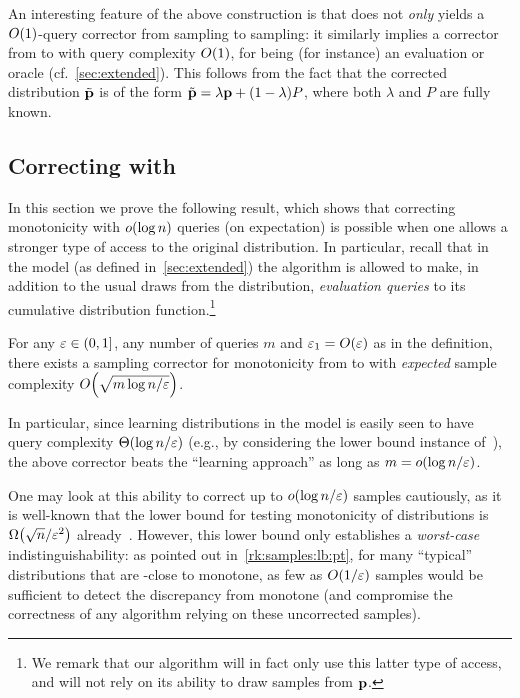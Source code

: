 \begin{remark}\label{rk:oblivious:stronger:queries}
An interesting feature of the above construction is that does not
\emph{only} yields a $\bigO{1}$-query corrector from {sampling to sampling}: it
similarly implies a corrector from \ORACLE to \ORACLE with query complexity
$\bigO{1}$, for \ORACLE being (for instance) an evaluation or \Cdfsamp oracle (cf.~\cref{sec:extended}). 
This follows from the fact that the corrected distribution $\tilde{\mathbf{p}}$ is of the form $\tilde{\mathbf{p}} = \lambda\mathbf{p}+(1-\lambda)P$, where
both $\lambda$ and $P$ are fully known.
\end{remark}

\subsection{Correcting with }\label{sec:monotonicity:cdf}
\newcommand{\supb}{S}

In this section we prove the following result, which shows that correcting monotonicity with $\littleO{\log n}$ queries (on expectation) is possible when one allows a stronger type of access to the original distribution. In particular, recall that in the \Cdfsamp model (as defined in~\cref{sec:extended}) the algorithm is allowed to make, in addition to the usual draws from the distribution, \emph{evaluation queries} to its cumulative distribution function.\footnote{We remark that our algorithm will in fact only use this latter type of access, and will not rely on its ability to draw samples from $\mathbf{p}$.}

\begin{theorem}\label{theo:samp:corrector:monotonicity:cdf}
For any $\varepsilon \in (0,1]$, any number of queries $m$ and $\eps_1 = \bigO{\eps}$ as in the definition, there exists a sampling corrector for monotonicity from \Cdfsamp to \SAMP with \emph{expected} sample complexity $\bigO{\sqrt{m\log n/\eps}}$.
\end{theorem}
\noindent In particular, since learning distributions in the \Cdfsamp model is easily seen to have query complexity $\bigTheta{\log n/\eps}$ (e.g., by considering the lower bound instance of~\cite{Birge:87}), the above corrector beats the ``learning approach'' as long as $m=\littleO{\log n/\eps}$.

{
\begin{remark}
One may look at this ability to correct up to $\littleO{\log n/\eps}$ samples cautiously, as it is well-known that the lower bound for testing monotonicity of distributions is $\bigOmega{\sqrt{n}/\eps^2}$ already~\cite{BKR:04}. However, this lower bound only establishes a \emph{worst-case} indistinguishability: as pointed out in~\cref{rk:samples:lb:pt}, for many ``typical'' distributions that are \eps-close to monotone, as few as $O(1/\varepsilon)$ samples would be sufficient to detect the discrepancy from monotone (and compromise the correctness of any algorithm relying on these uncorrected samples). 
\end{remark}
}

